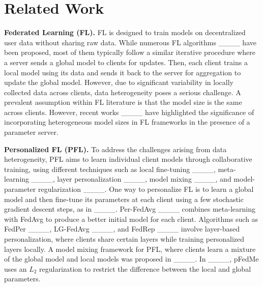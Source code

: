 \section{Related Work}
\label{relatedwork}
\textbf{Federated Learning (FL).} FL is designed to train models on decentralized user data without sharing raw data. While numerous FL algorithms ____ have been proposed, most of them typically follow a similar iterative procedure where a server sends a global model to clients for updates. Then, each client trains a local model using its data and sends it back to the server for aggregation to update the global model. However, due to significant variability in locally collected data across clients, data heterogeneity poses a serious challenge. A prevalent assumption within FL literature is that the model size is the same across clients. However, recent works ____ have highlighted the significance of incorporating heterogeneous model sizes in FL frameworks in the presence of a parameter server.

\textbf{Personalized FL (PFL).} To address the challenges arising from data heterogeneity, PFL aims to learn individual client models through collaborative training, using different techniques such as local fine-tuning ____, meta-learning ____, layer personalization ____, model mixing ____, and model-parameter regularization ____. One way to personalize FL is to learn a global model and then fine-tune its parameters at each client using a few stochastic gradient descent steps, as in ____. Per-FedAvg ____ combines meta-learning with FedAvg to produce a better initial model for each client. Algorithms such as FedPer ____, LG-FedAvg ____, and FedRep ____ involve layer-based personalization, where clients share certain layers while training personalized layers locally.  A model mixing framework for PFL, where clients learn a mixture of the global model and local models was proposed in ____. In ____, pFedMe uses an $L_2$ regularization to restrict the difference between the local and global parameters. 

